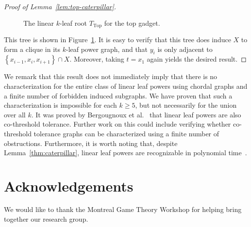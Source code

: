 \documentclass[11pt,letter]{article}
\theoremstyle{remark}
\newcommand{\T}{\text{Top}}
\newcommand{\set}[1]{\left\{#1\right\}}
\begin{document}
\begin{proof}[Proof of Lemma~\ref{lem:top-caterpillar}]
\begin{figure}[h!]
        \caption{The linear $k$-leaf root $T_{\T}$ for the top gadget.}
        \label{fig:caterpilar-Leaf-Root}
    \end{figure}
    This tree is shown in Figure~\ref{fig:caterpilar-Leaf-Root}.
    It is easy to verify that this tree does induce $X$ to form a clique in its $k$-leaf power graph, and that $y_i$ is only adjacent to $\set{x_{i-1},x_i,x_{i+1}}\cap X$. Moreover, taking $t = x_1$ again yields the desired result.
\end{proof}
We remark that this result does not immediately imply that there is no characterization for the entire class of linear leaf powers using chordal graphs and a finite number of forbidden induced subgraphs.
We have proven that such a characterization is impossible for each $k\geq 5$, but not necessarily for the union over all $k$. It was proved by Bergougnoux et al.~\cite{Bergougnoux} that linear leaf powers are also co-threshold tolerance. Further work on this could include verifying whether co-threshold tolerance graphs can be characterized using a finite number of obstructions.
Furthermore, it is worth noting that, despite Lemma~\ref{thm:caterpillar}, linear leaf powers are recognizable in polynomial time~\cite{Bergougnoux}. 

\section{Acknowledgements}

We would like to thank the Montreal Game Theory Workshop for helping bring together our research group.
\end{document}
